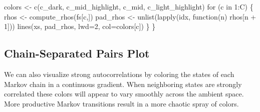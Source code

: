 \documentclass[
  letterpaper,
  DIV=11,
  numbers=noendperiod]{scrartcl}
\newenvironment{Shaded}{\begin{snugshade}}{\end{snugshade}}
\newcommand{\ControlFlowTok}[1]{\textcolor[rgb]{0.00,0.23,0.31}{#1}}
\newcommand{\DecValTok}[1]{\textcolor[rgb]{0.68,0.00,0.00}{#1}}
\newcommand{\KeywordTok}[1]{\textcolor[rgb]{0.00,0.23,0.31}{#1}}
\newcommand{\NormalTok}[1]{\textcolor[rgb]{0.00,0.23,0.31}{#1}}
\newcommand{\OperatorTok}[1]{\textcolor[rgb]{0.37,0.37,0.37}{#1}}
\begin{document}
\begin{Shaded}
\begin{Highlighting}[]
\NormalTok{  colors }\OperatorTok{\textless{}{-}}\NormalTok{ c(c\_dark, c\_mid\_highlight, c\_mid, c\_light\_highlight)}
  \ControlFlowTok{for}\NormalTok{ (c }\KeywordTok{in} \DecValTok{1}\NormalTok{:C) \{}
\NormalTok{    rhos }\OperatorTok{\textless{}{-}}\NormalTok{ compute\_rhos(fs[c,])}
\NormalTok{    pad\_rhos }\OperatorTok{\textless{}{-}}\NormalTok{ unlist(lapply(idx, function(n) rhos[n }\OperatorTok{+} \DecValTok{1}\NormalTok{]))}
\NormalTok{    lines(xs, pad\_rhos, lwd}\OperatorTok{=}\DecValTok{2}\NormalTok{, col}\OperatorTok{=}\NormalTok{colors[c])}
\NormalTok{  \}}
\NormalTok{\}}
\end{Highlighting}
\end{Shaded}

\hypertarget{chain-separated-pairs-plot}{%
\subsection{Chain-Separated Pairs
Plot}\label{chain-separated-pairs-plot}}

We can also visualize strong autocorrelations by coloring the states of
each Markov chain in a continuous gradient. When neighboring states are
strongly correlated these colors will appear to vary smoothly across the
ambient space. More productive Markov transitions result in a more
chaotic spray of colors.
\end{document}
